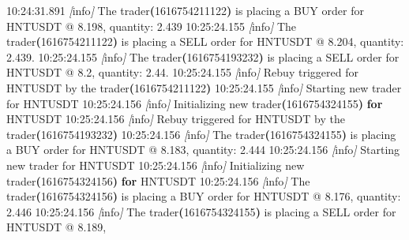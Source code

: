\documentclass[
  oneside]{book}
\newenvironment{Shaded}{\begin{snugshade}}{\end{snugshade}}
\newcommand{\ControlFlowTok}[1]{\textcolor[rgb]{0.13,0.29,0.53}{\textbf{#1}}}
\newcommand{\ErrorTok}[1]{\textcolor[rgb]{0.64,0.00,0.00}{\textbf{#1}}}
\newcommand{\ExtensionTok}[1]{#1}
\newcommand{\KeywordTok}[1]{\textcolor[rgb]{0.13,0.29,0.53}{\textbf{#1}}}
\newcommand{\NormalTok}[1]{#1}
\newcommand{\PreprocessorTok}[1]{\textcolor[rgb]{0.56,0.35,0.01}{\textit{#1}}}
\newcommand{\SpecialStringTok}[1]{\textcolor[rgb]{0.31,0.60,0.02}{#1}}
\begin{document}
\begin{Shaded}
\begin{Highlighting}[]
\ExtensionTok{10:24:31.891} \PreprocessorTok{[}\SpecialStringTok{info}\PreprocessorTok{]}\NormalTok{  The trader}\ErrorTok{(}\ExtensionTok{1616754211122}\KeywordTok{)} \ExtensionTok{is}\NormalTok{ placing a BUY order for HNTUSDT @ 8.198,}
\ExtensionTok{quantity:}\NormalTok{ 2.439}
\ExtensionTok{10:25:24.155} \PreprocessorTok{[}\SpecialStringTok{info}\PreprocessorTok{]}\NormalTok{  The trader}\ErrorTok{(}\ExtensionTok{1616754211122}\KeywordTok{)} \ExtensionTok{is}\NormalTok{ placing a SELL order for HNTUSDT @ 8.204,}
\ExtensionTok{quantity:}\NormalTok{ 2.439.}
\ExtensionTok{10:25:24.155} \PreprocessorTok{[}\SpecialStringTok{info}\PreprocessorTok{]}\NormalTok{  The trader}\ErrorTok{(}\ExtensionTok{1616754193232}\KeywordTok{)} \ExtensionTok{is}\NormalTok{ placing a SELL order for HNTUSDT @ 8.2,}
\ExtensionTok{quantity:}\NormalTok{ 2.44.}
\ExtensionTok{10:25:24.155} \PreprocessorTok{[}\SpecialStringTok{info}\PreprocessorTok{]}\NormalTok{  Rebuy triggered for HNTUSDT by the trader}\ErrorTok{(}\ExtensionTok{1616754211122}\KeywordTok{)}
\ExtensionTok{10:25:24.155} \PreprocessorTok{[}\SpecialStringTok{info}\PreprocessorTok{]}\NormalTok{  Starting new trader for HNTUSDT}
\ExtensionTok{10:25:24.156} \PreprocessorTok{[}\SpecialStringTok{info}\PreprocessorTok{]}\NormalTok{  Initializing new trader}\ErrorTok{(}\ExtensionTok{1616754324155}\KeywordTok{)} \ControlFlowTok{for}\NormalTok{ HNTUSDT}
\ExtensionTok{10:25:24.156} \PreprocessorTok{[}\SpecialStringTok{info}\PreprocessorTok{]}\NormalTok{  Rebuy triggered for HNTUSDT by the trader}\ErrorTok{(}\ExtensionTok{1616754193232}\KeywordTok{)}
\ExtensionTok{10:25:24.156} \PreprocessorTok{[}\SpecialStringTok{info}\PreprocessorTok{]}\NormalTok{  The trader}\ErrorTok{(}\ExtensionTok{1616754324155}\KeywordTok{)} \ExtensionTok{is}\NormalTok{ placing a BUY order for HNTUSDT @ 8.183,}
\ExtensionTok{quantity:}\NormalTok{ 2.444}
\ExtensionTok{10:25:24.156} \PreprocessorTok{[}\SpecialStringTok{info}\PreprocessorTok{]}\NormalTok{  Starting new trader for HNTUSDT}
\ExtensionTok{10:25:24.156} \PreprocessorTok{[}\SpecialStringTok{info}\PreprocessorTok{]}\NormalTok{  Initializing new trader}\ErrorTok{(}\ExtensionTok{1616754324156}\KeywordTok{)} \ControlFlowTok{for}\NormalTok{ HNTUSDT }
\ExtensionTok{10:25:24.156} \PreprocessorTok{[}\SpecialStringTok{info}\PreprocessorTok{]}\NormalTok{  The trader}\ErrorTok{(}\ExtensionTok{1616754324156}\KeywordTok{)} \ExtensionTok{is}\NormalTok{ placing a BUY order for HNTUSDT @ 8.176,}
\ExtensionTok{quantity:}\NormalTok{ 2.446}
\ExtensionTok{10:25:24.156} \PreprocessorTok{[}\SpecialStringTok{info}\PreprocessorTok{]}\NormalTok{  The trader}\ErrorTok{(}\ExtensionTok{1616754324155}\KeywordTok{)} \ExtensionTok{is}\NormalTok{ placing a SELL order for HNTUSDT @ 8.189,}

\end{Highlighting}
\end{Shaded}
\end{document}
